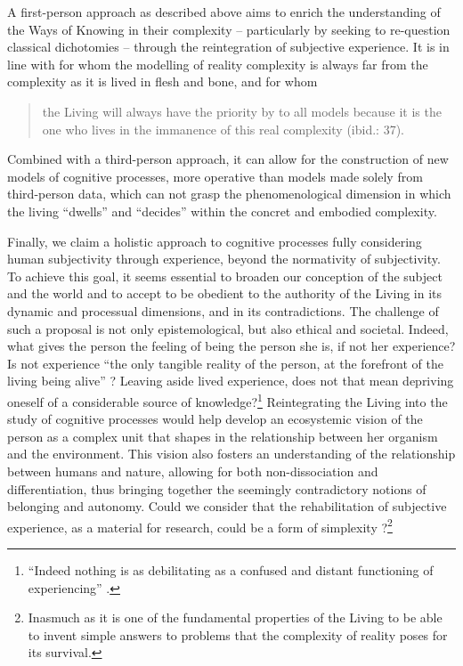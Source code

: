 \documentclass[output=paper]{langscibook}
\begin{document}
A first-person approach as described above aims to enrich the understanding of the Ways of Knowing in their complexity -- particularly by seeking to re-question classical dichotomies -- through the reintegration of subjective experience. It is in line with \citet{BerthozPetit2014} for whom the modelling of reality complexity is always far from the complexity as it is lived in flesh and bone, and for whom 

\begin{quote}
the Living will always have the priority by to all models because it is the one who lives in the immanence of this real complexity (ibid.: 37). 
\end{quote}

\begin{sloppypar}
Combined with a third-person approach, it can allow for the construction of new models of cognitive processes, more operative than models made solely from third-person data, which can not grasp the phenomenological dimension in which the living “dwells” and “decides” within the concret and embodied complexity.
\end{sloppypar}

Finally, we claim a holistic approach to cognitive processes fully considering human subjectivity through experience, beyond the normativity of subjectivity. To achieve this goal, it seems essential to broaden our conception of the subject and the world and to accept to be obedient to the authority of the Living in its dynamic and processual dimensions, and in its contradictions. The challenge of such a proposal is not only epistemological, but also ethical and societal. Indeed, what gives the person the feeling of being the person she is, if not her experience? Is not experience “the only tangible reality of the person, at the forefront of the living being alive” \citep{Lamboy2003}? Leaving aside lived experience, does not that mean depriving oneself of a considerable source of knowledge?\footnote{“Indeed nothing is as debilitating as a confused and distant functioning of experiencing” \citep[15--16]{Gendlin1962}.} Reintegrating the Living into the study of cognitive processes would help develop an ecosystemic vision of the person as a complex unit that shapes in the relationship between her organism and the environment. This vision also fosters an understanding of the relationship between humans and nature, allowing for both non-dissociation and differentiation, thus bringing together the seemingly contradictory notions of belonging and autonomy. Could we consider that the rehabilitation of subjective experience, as a material for research, could be a form of simplexity \citep{Perrier2014, BerthozPetit2014}?\footnote{Inasmuch as it is one of the fundamental properties of the Living to be able to invent simple answers to problems that the complexity of reality poses for its survival.}
\end{document}
